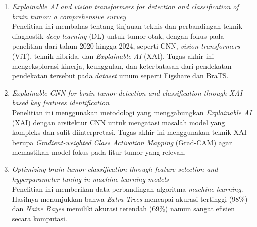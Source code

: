 \begin{enumerate}
	\item \textit{Explainable AI and vision transformers for detection and classification of brain tumor: a comprehensive survey} \cite{hosny2025explainable} \\
	Penelitian ini membahas tentang tinjauan teknis dan perbandingan teknik diagnostik \textit{deep learning} (DL) untuk tumor otak, dengan fokus pada penelitian dari tahun 2020 hingga 2024, seperti CNN, \textit{vision transformers} (ViT), teknik hibrida, dan \textit{Explainable AI} (XAI). Tugas akhir ini mengeksplorasi kinerja, keunggulan, dan keterbatasan dari pendekatan-pendekatan tersebut pada \textit{dataset} umum seperti Figshare dan BraTS.
	
	\item \textit{Explainable CNN for brain tumor detection and classification through XAI based key features identification} \cite{iftikhar2025explainable}\\
	Penelitian ini menggunakan metodologi yang menggabungkan \textit{Explainable AI} (XAI) dengan arsitektur CNN untuk mengatasi masalah model yang kompleks dan sulit diinterpretasi. Tugas akhir ini menggunakan teknik XAI berupa \textit{Gradient-weighted Class Activation Mapping} (Grad-CAM) agar memastikan model fokus pada fitur tumor yang relevan.
	
	\item \textit{Optimizing brain tumor classification through feature selection and hyperparameter tuning in machine learning models} \autocite{tahosin2023optimizing}\\
	Penelitian ini memberikan data perbandingan algoritma \textit{machine learning}. Hasilnya menunjukkan bahwa \textit{Extra Trees} mencapai akurasi tertinggi (98\%) dan \textit{Naive Bayes} memiliki akurasi terendah (69\%) namun sangat efisien secara komputasi.
\end{enumerate}

